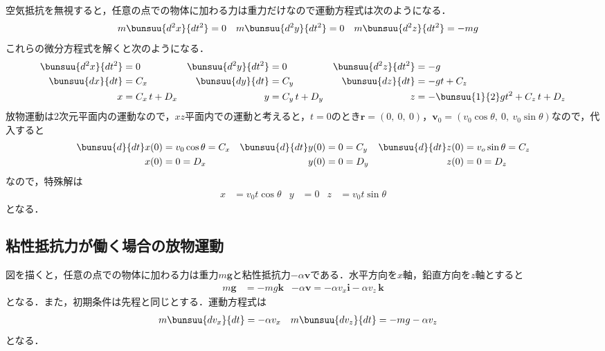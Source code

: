 空気抵抗を無視すると，任意の点での物体に加わる力は重力だけなので運動方程式は次のようになる．
\begin{align}
	&m\bunsuu{d^2 x}{dt^2} = 0 & &m\bunsuu{d^2 y}{dt^2} = 0 & &m\bunsuu{d^2 z}{dt^2} = -mg
\end{align}
これらの微分方程式を解くと次のようになる．
\begin{align*}
	\bunsuu{d^2 x}{dt^2} &= 0 & \bunsuu{d^2 y}{dt^2} &= 0 & \bunsuu{d^2 z}{dt^2} &= -g\\
	\bunsuu{dx}{dt} &= C_x & \bunsuu{dy}{dt} &= C_y & \bunsuu{dz}{dt} &= -gt + C_z\\
	x &= C_x\,t + D_x & y &= C_y\,t + D_y & z &= -\bunsuu{1}{2}gt^2 + C_z\,t + D_z
\end{align*}
放物運動は2次元平面内の運動なので，$xz$平面内での運動と考えると，$t = 0$のとき$\bm{r} = (0,\ 0,\ 0)$，$\bm{v}_0 = (v_0\cos\theta,\ 0,\ v_0\sin\theta)$なので，代入すると
\begin{align*}
	\bunsuu{d}{dt}x(0) &= v_0\cos\theta = C_x &
	\bunsuu{d}{dt}y(0) &= 0 = C_y &
	\bunsuu{d}{dt}z(0) &= v_o\sin\theta = C_z\\
	x(0) &= 0 = D_x &
	y(0) &= 0 = D_y &
	z(0) &= 0 = D_z
\end{align*}
なので，特殊解は
\begin{align}
	x &= v_0t\cos\theta & y &= 0 & z &= v_0 t\sin\theta
\end{align}
となる．



\subsection{粘性抵抗力が働く場合の放物運動}

図を描くと，任意の点での物体に加わる力は重力$m\bm{g}$と粘性抵抗力$-\alpha\bm{v}$である．水平方向を$x$軸，鉛直方向を$z$軸とすると
\begin{align*}
	m\bm{g} &= -mg\bm{k} & -\alpha\bm{v} = -\alpha v_x \bm{i} - \alpha v_z\,\bm{k}
\end{align*}
となる．また，初期条件は先程と同じとする．運動方程式は
\begin{align}
	m\bunsuu{d v_x}{dt} &= -\alpha v_x & m\bunsuu{d v_z}{dt} &= -mg - \alpha v_z
\end{align}
となる．

